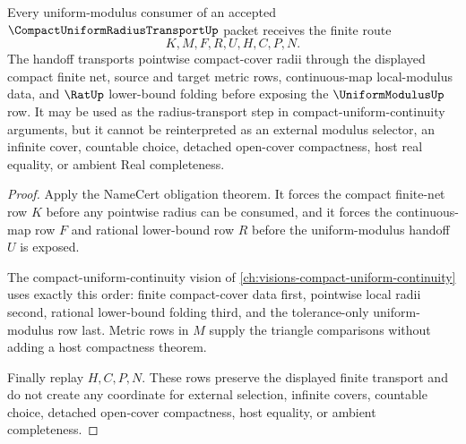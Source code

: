 \begin{theorem}
\label{thm:compact-uniform-radius-transport-handoff}
Every uniform-modulus consumer of an accepted $\CompactUniformRadiusTransportUp$ packet receives the finite route
$$
K,M,F,R,U,H,C,P,N .
$$
The handoff transports pointwise compact-cover radii through the displayed compact finite net, source and target metric rows, continuous-map local-modulus data, and $\RatUp$ lower-bound folding before exposing the $\UniformModulusUp$ row. It may be used as the radius-transport step in compact-uniform-continuity arguments, but it cannot be reinterpreted as an external modulus selector, an infinite cover, countable choice, detached open-cover compactness, host real equality, or ambient Real completeness.
\end{theorem}
\begin{proof}
Apply the NameCert obligation theorem. It forces the compact finite-net row $K$ before any pointwise radius can be consumed, and it forces the continuous-map row $F$ and rational lower-bound row $R$ before the uniform-modulus handoff $U$ is exposed.

The compact-uniform-continuity vision of \autoref{ch:visions-compact-uniform-continuity} uses exactly this order: finite compact-cover data first, pointwise local radii second, rational lower-bound folding third, and the tolerance-only uniform-modulus row last. Metric rows in $M$ supply the triangle comparisons without adding a host compactness theorem.

Finally replay $H,C,P,N$. These rows preserve the displayed finite transport and do not create any coordinate for external selection, infinite covers, countable choice, detached open-cover compactness, host equality, or ambient completeness.
\end{proof}

\begin{closurestatus}{\CompactUniformRadiusTransportUp}
  \theoryclosure{\seedClosure}
  \formalstatus{\unformalizedV}
\end{closurestatus}
